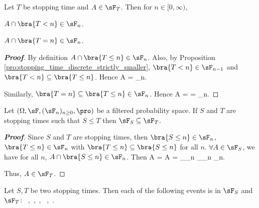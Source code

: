  
\begin{proposition}
Let $T$ be stopping time and $A\in \sF_T$. Then for $n\in [0,\infty)$,
\ben
\item [(i)] $A\cap \bra{T<n} \in \sF_n$.
\item [(ii)] $A\cap \bra{T=n}\in \sF_n$.
\een
\end{proposition}

\begin{proof}[\bf Proof]
\ben
\item [(i)] By definition $A\cap \bra{T\leq n} \in \sF_n$. Also, by Proposition \ref{pro:stopping_time_discrete_strictly_smaller}, $\bra{T<n}\in \sF_{n-1}$ and $\bra{T<n}\subseteq \bra{T\leq n}$. Hence
\be
A\cap {} = \cap {} \in \sF_n.
\ee

\item [(ii)] Similarly, $\bra{T=n} \subseteq \bra{T\leq n} \in \sF_n$. Hence
\be
A\cap {} =  \cap {} =  \cap {} \in \sF_n. 
\ee
\een
\end{proof}



\begin{proposition}\label{pro:sigma_algebra_stopping_time_increasing}
Let $(\Omega,\sF, (\sF_n)_{n\geq 0},\pro)$ be a filtered probability space. If $S$ and $T$ are stopping times such that $S \leq T$ then $\sF_S \subseteq \sF_T$.
\end{proposition}

\begin{proof}[\bf Proof]
Since $S$ and $T$ are stopping times, then $\bra{S \leq n}\in \sF_n$, $\bra{T \leq n}\in \sF_n$ with $\bra{T\leq n} \subseteq \bra{S\leq n}$ for all $n$. $\forall A \in \sF_S$, we have for all $n$, $A \cap \bra{S \leq n} \in \sF_n$. Then
\be
A \cap {} = A \cap {} = _{\in \sF_n} \cap {}_{\in \sF_n} \in \sF_n.
\ee

Thus, $A\in \sF_T$.
\end{proof}



\begin{proposition}
Let $S,T$ be two stopping times. Then each of the following events is in $\sF_S$ and $\sF_T$:
\be
{}\ ,\quad{}\ ,\quad {}\ , \quad {}\  ,\quad{}\ .
\ee
\end{proposition}


